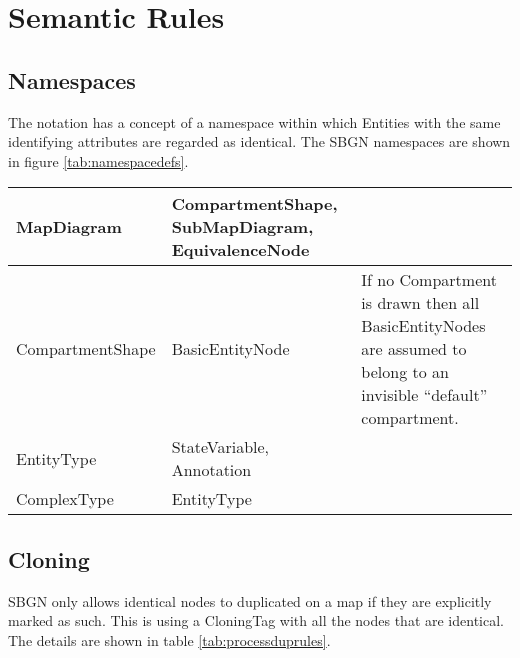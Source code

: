 \section{Semantic Rules}

\subsection{Namespaces}

The notation has a concept of a namespace within which Entities with the same 
identifying attributes are regarded as identical. The SBGN namespaces are shown 
in figure \ref{tab:namespacedefs}.


\begin{center}
\begin{small}
\tablelasttail{\hline}
\label{tab:namespacedefs}
\begin{supertabular}{|l|p{5cm}|p{4cm}|}\hline
%
MapDiagram & CompartmentShape, SubMapDiagram, EquivalenceNode & \\\hline
%
CompartmentShape & BasicEntityNode & If no Compartment is drawn then all BasicEntityNodes are assumed to belong to an invisible ``default'' compartment.\\\hline
EntityType & StateVariable, Annotation & \\\hline
ComplexType & EntityType & \\\hline
\end{supertabular}
\end{small}
\end{center}

\subsection{Cloning}

SBGN only allows identical nodes to duplicated on a map if they are
explicitly marked as such. This is using a CloningTag with all the
nodes that are identical. The details are shown in table \ref{tab:processduprules}.


